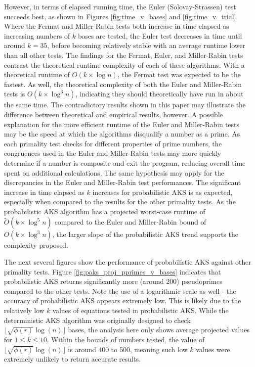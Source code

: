 \documentclass{article}
\begin{document}
However, in terms of elapsed running time, the Euler (Solovay-Strassen) test succeeds best, as shown in Figures \ref{fig:time_v_bases} and \ref{fig:time_v_trial}. Where the Fermat and Miller-Rabin tests both increase in time elapsed as increasing numbers of $k$ bases are tested, the Euler test decreases in time until around $k = 35$, before becoming relatively stable with an average runtime lower than all other tests. The findings for the Fermat, Euler, and Miller-Rabin tests contrast the theoretical runtime complexity of each of these algorithms. With a theoretical runtime of $O(k \times \log{n})$, the Fermat test was expected to be the fastest. As well, the theoretical complexity of both the Euler and Miller-Rabin tests is $O(k \times \log^3{n})$, indicating they should theoretically have run in about the same time. The contradictory results shown in this paper may illustrate the difference between theoretical and empirical results, however. A possible explanation for the more efficient runtime of the Euler and Miller-Rabin tests may be the speed at which the algorithms disqualify a number as a prime. As each primality test checks for different properties of prime numbers, the congruences used in the Euler and Miller-Rabin tests may more quickly determine if a number is composite and exit the program, reducing overall time spent on additional calculations. The same hypothesis may apply for the discrepancies in the Euler and Miller-Rabin test performances. The significant increase in time elapsed as $k$ increases for probabilistic AKS is as expected, especially when compared to the results for the other primality tests. As the probabilistic AKS algorithm has a projected worst-case runtime of $\widetilde{O}(k \times \log^5{n})$ compared to the Euler and Miller-Rabin bound of $O(k \times \log^3{n})$, the larger slope of the probabilistic AKS trend supports the complexity proposed.

The next several figures show the performance of probabilistic AKS against other primality tests. Figure \ref{fig:paks_proj_pprimes_v_bases} indicates that probabilistic AKS returns significantly more (around 200) pseudoprimes compared to the other tests. Note the use of a logarithmic scale as well - the accuracy of probabilistic AKS appears extremely low. This is likely due to the relatively low $k$ values of equations tested in probabilistic AKS. While the deterministic AKS algorithm was originally designed to check $\lfloor \sqrt{\phi(r)}\log(n) \rfloor$ bases, the analysis here only shows average projected values for $1 \leq k \leq 10$. Within the bounds of numbers tested, the value of $\lfloor \sqrt{\phi(r)}\log(n) \rfloor$ is around 400 to 500, meaning such low $k$ values were extremely unlikely to return accurate results.
\end{document}
